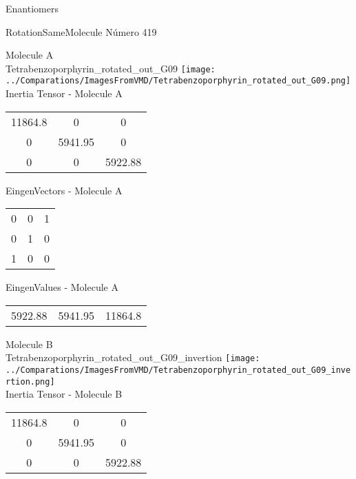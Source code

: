 \begin{center}
\vtab
\vtab
\textcolor{NavyBlue}{\Large Enantiomers}
\end{center}

 \newpage

\vtab[-2cm]
\begin{center}
{\large RotationSameMolecule \tab Número 419}
\end{center}
\begin{multicols}{2}
\begin{center}

Molecule A \\ 
Tetrabenzoporphyrin\_rotated\_out\_G09
\texttt{[image: ../Comparations/ImagesFromVMD/Tetrabenzoporphyrin\_rotated\_out\_G09.png]}
\\
Inertia Tensor - Molecule A \\
\vtab

\begin{tabular}{|c c c|}
11864.8	 & 	0	 & 	0	 \\
0	 & 	5941.95	 & 	0	 \\
0	 & 	0	 & 	5922.88
\end{tabular}

\vtab
 EingenVectors - Molecule A     \\
\vtab
\begin{tabular}{|c c c|}
0	 & 	0	 & 	1	 \\
0	 & 	1	 & 	0	 \\
1	 & 	0	 & 	0
\end{tabular}

\vtab
 EingenValues - Molecule A     \\
\vtab
\begin{tabular}{|c c c|}
5922.88	 & 	5941.95	 & 	11864.8	 \\
\end{tabular}
\columnbreak

Molecule B \\ 
Tetrabenzoporphyrin\_rotated\_out\_G09\_invertion
\texttt{[image: ../Comparations/ImagesFromVMD/Tetrabenzoporphyrin\_rotated\_out\_G09\_invertion.png]}
\\
Inertia Tensor - Molecule B \\
\vtab

\begin{tabular}{|c c c|}
11864.8	 & 	0	 & 	0	 \\
0	 & 	5941.95	 & 	0	 \\
0	 & 	0	 & 	5922.88
\end{tabular}


\end{center}
\end{multicols}
